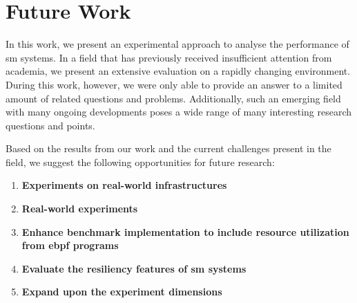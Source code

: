 \section{Future Work}
\label{sec:conclusion:future-work}

In this work, we present an experimental approach to analyse the performance of \gls{sm} systems. In a field that has previously received insufficient attention from academia, we present an extensive evaluation on a rapidly changing environment. During this work, however, we were only able to provide an answer to a limited amount of related questions and problems. Additionally, such an emerging field with many ongoing developments poses a wide range of many interesting research questions and points.

Based on the results from our work and the current challenges present in the field, we suggest the following opportunities for future research:


\begin{enumerate}
    \item \textbf{Experiments on real-world infrastructures}

    \item \textbf{Real-world experiments}
    
    \item \textbf{Enhance benchmark implementation to include resource utilization from \gls{ebpf} programs}
    
    \item \textbf{Evaluate the resiliency features of \gls{sm} systems}
    
    \item \textbf{Expand upon the experiment dimensions}

\end{enumerate}
